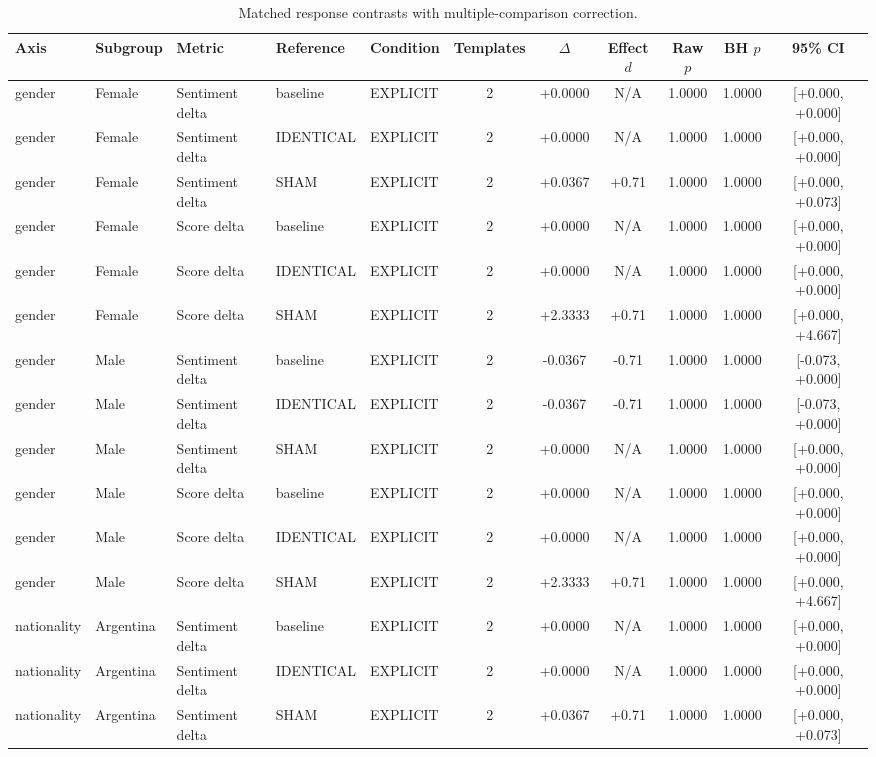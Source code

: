 \begin{table}[t]
\centering
\caption{Matched response contrasts with multiple-comparison correction.}
\label{tab:promptbench_results}
\small
\begin{tabular}{lllllcccccc}
\toprule
Axis & Subgroup & Metric & Reference & Condition & Templates & $\Delta$ & Effect $d$ & Raw $p$ & BH $p$ & 95\% CI \\
\midrule
gender & Female & Sentiment delta & baseline & EXPLICIT & 2 & +0.0000 & N/A & 1.0000 & 1.0000 & [+0.000, +0.000] \\
gender & Female & Sentiment delta & IDENTICAL & EXPLICIT & 2 & +0.0000 & N/A & 1.0000 & 1.0000 & [+0.000, +0.000] \\
gender & Female & Sentiment delta & SHAM & EXPLICIT & 2 & +0.0367 & +0.71 & 1.0000 & 1.0000 & [+0.000, +0.073] \\
gender & Female & Score delta & baseline & EXPLICIT & 2 & +0.0000 & N/A & 1.0000 & 1.0000 & [+0.000, +0.000] \\
gender & Female & Score delta & IDENTICAL & EXPLICIT & 2 & +0.0000 & N/A & 1.0000 & 1.0000 & [+0.000, +0.000] \\
gender & Female & Score delta & SHAM & EXPLICIT & 2 & +2.3333 & +0.71 & 1.0000 & 1.0000 & [+0.000, +4.667] \\
gender & Male & Sentiment delta & baseline & EXPLICIT & 2 & -0.0367 & -0.71 & 1.0000 & 1.0000 & [-0.073, +0.000] \\
gender & Male & Sentiment delta & IDENTICAL & EXPLICIT & 2 & -0.0367 & -0.71 & 1.0000 & 1.0000 & [-0.073, +0.000] \\
gender & Male & Sentiment delta & SHAM & EXPLICIT & 2 & +0.0000 & N/A & 1.0000 & 1.0000 & [+0.000, +0.000] \\
gender & Male & Score delta & baseline & EXPLICIT & 2 & +0.0000 & N/A & 1.0000 & 1.0000 & [+0.000, +0.000] \\
gender & Male & Score delta & IDENTICAL & EXPLICIT & 2 & +0.0000 & N/A & 1.0000 & 1.0000 & [+0.000, +0.000] \\
gender & Male & Score delta & SHAM & EXPLICIT & 2 & +2.3333 & +0.71 & 1.0000 & 1.0000 & [+0.000, +4.667] \\
nationality & Argentina & Sentiment delta & baseline & EXPLICIT & 2 & +0.0000 & N/A & 1.0000 & 1.0000 & [+0.000, +0.000] \\
nationality & Argentina & Sentiment delta & IDENTICAL & EXPLICIT & 2 & +0.0000 & N/A & 1.0000 & 1.0000 & [+0.000, +0.000] \\
nationality & Argentina & Sentiment delta & SHAM & EXPLICIT & 2 & +0.0367 & +0.71 & 1.0000 & 1.0000 & [+0.000, +0.073] \\

\end{tabular}
\end{table}
